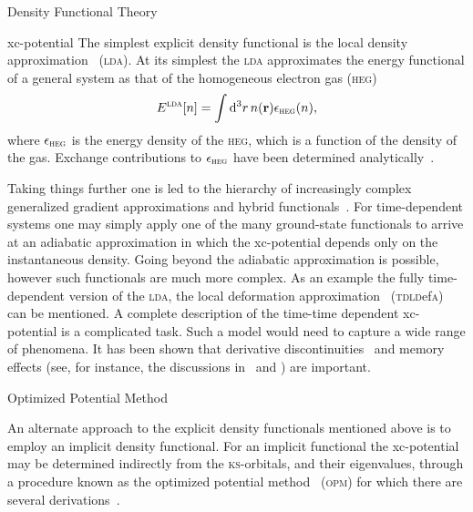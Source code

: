 \documentclass[letterpaper, 11 pt]{report}
\begin{document}
\begin{chapter}{Density Functional Theory \label{chap:dft}}
\begin{section}{xc-potential \label{sec:xcpot}}
      The simplest explicit density functional is the local density approximation~\cite{ks-eq}
      (\textsc{lda}). At its simplest the \textsc{lda} approximates the energy functional of a general
      system as that of the homogeneous electron gas (\textsc{heg})
      \begin{equation} \label{eq:ldaE}
         E^\textsc{lda}[n] = \int \mathrm{d}^3 r \, n(\mathbf{r}) \epsilon_\textsc{heg}(n),
      \end{equation}
      where $\epsilon_\textsc{heg}$ is the energy density of the \textsc{heg}, which is a function of
      the density of the gas. Exchange contributions to $\epsilon_\textsc{heg}$ have been determined
      analytically~\cite{heg}.

      Taking things further one is led to the hierarchy of increasingly complex
      generalized gradient approximations and hybrid functionals~\cite{gga+}. For time-dependent systems
      one may simply apply one of the many ground-state functionals to arrive at an adiabatic
      approximation in which the xc-potential depends only on the instantaneous density. Going beyond
      the adiabatic approximation is possible, however such functionals are much more complex. As an
      example the fully time-dependent version of the \textsc{lda}, the local deformation
      approximation~\cite{TDLDefA1, TDLDefA2} (\textsc{tdld}ef\textsc{a}) can be mentioned. A complete
      description of the time-time dependent xc-potential is a complicated task. Such a model would need
      to capture a wide range of phenomena. It has been shown that derivative
      discontinuities~\cite{derDis} and memory effects (see, for instance, the discussions
      in~\cite{tddft} and \cite{ullrich}) are important.

      \begin{subsection}{Optimized Potential Method \label{sec:opm}}

         An alternate approach to the explicit density functionals mentioned above is to employ an
         implicit density functional. For an implicit functional the xc-potential may be determined
         indirectly from the \textsc{ks}-orbitals, and their eigenvalues, through a procedure known as
         the optimized potential method~\cite{opm1, opm2} (\textsc{opm}) for which there are several
         derivations~\cite{opm1, opm2, opm3, opm4, opm5, opm-rev}.


\end{subsection}
\end{section}
\end{chapter}
\end{document}
